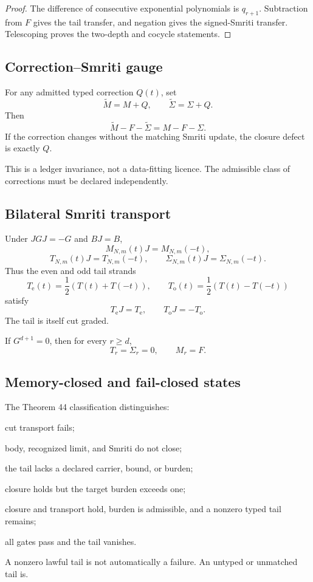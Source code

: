 \begin{proof}
The difference of consecutive exponential polynomials is $q_{r+1}$. Subtraction from $F$ gives the tail transfer, and negation gives the signed-Smriti transfer. Telescoping proves the two-depth and cocycle statements.
\end{proof}

\subsection{Correction--Smriti gauge}

\begin{proposition}
For any admitted typed correction $Q(t)$, set
\[
 \widetilde M=M+Q,
 \qquad
 \widetilde\Sigma=\Sigma+Q.
\]
Then
\[
 \widetilde M-F-\widetilde\Sigma=M-F-\Sigma.
\]
If the correction changes without the matching Smriti update, the closure defect is exactly $Q$.
\end{proposition}

This is a ledger invariance, not a data-fitting licence. The admissible class of corrections must be declared independently.

\subsection{Bilateral Smriti transport}

Under $JGJ=-G$ and $BJ=B$,
\[
 M_{N,m}(t)J=M_{N,m}(-t),
\]
\[
 T_{N,m}(t)J=T_{N,m}(-t),
 \qquad
 \Sigma_{N,m}(t)J=\Sigma_{N,m}(-t).
\]
Thus the even and odd tail strands
\[
 T_{\mathrm e}(t)=\frac12(T(t)+T(-t)),
 \qquad
 T_{\mathrm o}(t)=\frac12(T(t)-T(-t))
\]
satisfy
\[
 T_{\mathrm e}J=T_{\mathrm e},
 \qquad
 T_{\mathrm o}J=-T_{\mathrm o}.
\]
The tail is itself cut graded.

\begin{corollary}
If $G^{d+1}=0$, then for every $r\ge d$,
\[
 T_r=\Sigma_r=0,
 \qquad
 M_r=F.
\]
\end{corollary}

\subsection{Memory-closed and fail-closed states}

The Theorem 44 classification distinguishes:
\begin{description}[leftmargin=4.2em,style=nextline]
\item[OPEN\_BILATERAL\_SEAM] cut transport fails;
\item[OPEN\_RECOGNITION\_RESIDUE] body, recognized limit, and Smriti do not close;
\item[ABSTAIN\_UNTYPED\_TAIL] the tail lacks a declared carrier, bound, or burden;
\item[BURDEN\_EXCEEDS\_ONE] closure holds but the target burden exceeds one;
\item[MEMORY\_CLOSED] closure and transport hold, burden is admissible, and a nonzero typed tail remains;
\item[EXACT\_FINITE\_CLOSURE] all gates pass and the tail vanishes.
\end{description}

A nonzero lawful tail is not automatically a failure. An untyped or unmatched tail is.
